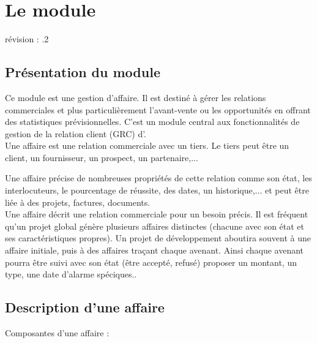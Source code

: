 
\clearpage
\section{Le module \deal}

révision : .2

\subsection{Présentation du module \deal}

Ce module est une gestion d'affaire.
Il est destiné à gérer les relations commerciales et plus particulièrement l'avant-vente ou les opportunités en offrant des statistiques prévisionnelles. C'est un module central aux fonctionnalités de gestion de la relation client (GRC) d'\obm.\\

Une affaire est une relation commerciale avec un tiers. Le tiers peut être un client, un fournisseur, un prospect, un partenaire,...

Une affaire précise de nombreuses propriétés de cette relation comme son état, les interlocuteurs, le pourcentage de réussite, des dates, un historique,... et peut être liée à des projets, factures, documents.\\

Une affaire décrit une relation commerciale pour un besoin précis. Il est fréquent qu'un projet global génère plusieurs affaires distinctes (chacune avec son état et ses caractéristiques propres).
Un projet de développement aboutira souvent à une affaire initiale, puis à des affaires traçant chaque avenant. Ainsi chaque avenant pourra être suivi avec son état (être accepté, refusé) proposer un montant, un type, une date d'alarme spéciques..

\subsection{Description d'une affaire}

Composantes d'une affaire :\\

